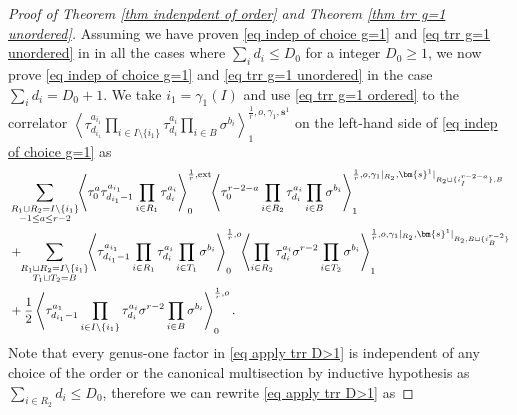 \documentclass[11pt]{amsart}
\theoremstyle{definition}
\theoremstyle{remark}
\newcommand{\consta}{{\frac{1}{2}}}
\newcommand{\<}{\left<}
\renewcommand{\>}{\right>}
\numberwithin{equation}{section}
\begin{document}
\begin{proof}[Proof of Theorem \ref{thm indenpdent of order} and Theorem \ref{thm trr g=1 unordered}]
    Assuming we have proven \eqref{eq indep of choice g=1} and  \eqref{eq trr g=1 unordered} in in all the cases where $\sum_i d_i\le D_0$ for a integer $D_0\ge 1$,  we now prove \eqref{eq indep of choice g=1} and  \eqref{eq trr g=1 unordered} in the case $\sum_i d_i= D_0+1$. We take $i_1=\gamma_1(I)$ and use \eqref{eq trr g=1 ordered}  to the correlator 
    $\left\langle \tau_{d_{i_1}}^{a_{i_1}}\prod_{i\in I\setminus \{i_1\}}\tau^{a_i}_{d_i}\prod_{i\in B}\sigma^{b_i}\right\rangle^{\frac{1}{r},o,\gamma_1,\bm{s}^1}_1$ on the left-hand side of \eqref{eq indep of choice g=1}  %
as
    \begin{equation}\label{eq apply trr D>1}
        \begin{split}
    &\sum_{\substack{R_1 \sqcup R_2 = I\setminus\{i_1\}\\ -1\le a \le r-2}}\hspace{-0.1cm}\left\langle \tau_0^{a}\tau_{d_{i_1}-1}^{a_{i_1}}\prod_{i \in R_1}\tau_{d_i}^{a_i}\right\rangle^{\frac{1}{r},\text{ext}}_0
    \hspace{-0.1cm}\left\langle \tau_0^{r-2-a}\prod_{i\in R_2}\tau^{a_i}_{d_i}\prod_{i\in B}\sigma^{b_i}\right\rangle^{\frac{1}{r},o,\gamma_1\vert_{R_2},\bm{s}^1\vert_{R_2\sqcup\{i^{r-2-a}_I\},B}}_1\\
    &+\hspace{-0.1cm}\sum_{\substack{R_1 \sqcup R_2 =  I\setminus\{i_1\} \\ T_1 \sqcup T_2 =  B}} \hspace{-0.1cm} \left\langle \tau^{a_{i_1}}_{d_{i_1}-1}\prod_{i \in R_1} \tau^{a_i}_{d_i}\prod_{i\in T_1}\sigma^{b_i}\right\rangle^{\frac{1}{r},o}_0 \hspace{-0.1cm}\left\langle \prod_{i \in R_2} \tau^{a_i}_{d_i} \sigma^{r-2}\prod_{i\in T_2}\sigma^{b_i}\right\rangle^{\frac{1}{r}, o,\gamma_1\vert_{R_2},\bm{s}^1\vert_{R_2,B\sqcup\{i^{r-2}_B\}}}_1\\
    &+\consta\left\langle \tau_{d_{i_1}-1}^{a_1}\prod_{i\in I\setminus\{i_1\}}\tau^{a_i}_{d_i}\sigma^{r-2}\prod_{i\in B}\sigma^{b_i}\right\rangle^{\frac{1}{r},o}_0.
    \end{split}
    \end{equation}
    Note %
that every genus-one factor in \eqref{eq apply trr D>1} is independent of any choice of the order or the canonical multisection by inductive hypothesis as $\sum_{i\in R_2}d_i \le D_0$, therefore we can rewrite \eqref{eq apply trr D>1} as 

\end{proof}
\end{document}
